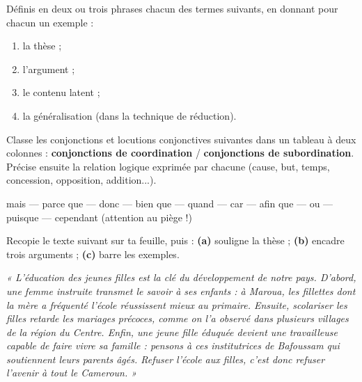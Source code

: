 \documentclass[11pt]{article}
\newcounter{popsec}
\newcounter{popsub}
\newcommand{\courssub}[1]{%
  \stepcounter{popsub}%
  \par\vspace{9pt}\noindent{\popxbold\fontsize{11.5}{13}\selectfont\color{popink}{\color{poporange}\thepopsec.\thepopsub}\hspace{6pt}#1}\par\nopagebreak\vspace{4pt}
}
\begin{document}
\begin{exercice}[Définitions]
Définis en deux ou trois phrases chacun des termes suivants, en donnant pour chacun un exemple :
\begin{enumerate}
\item la thèse ;
\item l'argument ;
\item le contenu latent ;
\item la généralisation (dans la technique de réduction).
\end{enumerate}
\end{exercice}

\begin{exercice}
Classe les conjonctions et locutions conjonctives suivantes dans un tableau à deux colonnes : \textbf{conjonctions de coordination} / \textbf{conjonctions de subordination}. Précise ensuite la relation logique exprimée par chacune (cause, but, temps, concession, opposition, addition...).
\begin{center}
mais — parce que — donc — bien que — quand — car — afin que — ou — puisque — cependant (attention au piège !)
\end{center}
\end{exercice}

\courssub{Je m'entraîne}

\begin{exercice}
Recopie le texte suivant sur ta feuille, puis : \textbf{(a)} souligne la thèse ; \textbf{(b)} encadre trois arguments ; \textbf{(c)} barre les exemples.

\emph{« L'éducation des jeunes filles est la clé du développement de notre pays. D'abord, une femme instruite transmet le savoir à ses enfants : à Maroua, les fillettes dont la mère a fréquenté l'école réussissent mieux au primaire. Ensuite, scolariser les filles retarde les mariages précoces, comme on l'a observé dans plusieurs villages de la région du Centre. Enfin, une jeune fille éduquée devient une travailleuse capable de faire vivre sa famille : pensons à ces institutrices de Bafoussam qui soutiennent leurs parents âgés. Refuser l'école aux filles, c'est donc refuser l'avenir à tout le Cameroun. »}
\end{exercice}
\end{document}

